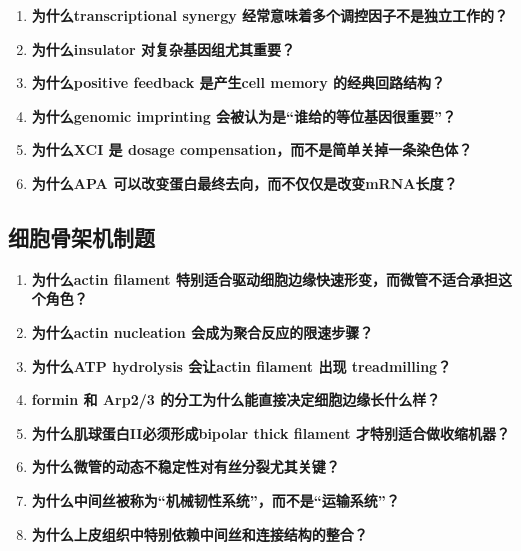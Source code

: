 \documentclass[12pt,fontset=none]{ctexart}
\begin{document}
\begin{enumerate}
\item \textbf{为什么transcriptional synergy 经常意味着多个调控因子不是独立工作的？}

\item \textbf{为什么insulator 对复杂基因组尤其重要？}

\item \textbf{为什么positive feedback 是产生cell memory 的经典回路结构？}

\item \textbf{为什么genomic imprinting 会被认为是“谁给的等位基因很重要”？}

\item \textbf{为什么XCI 是 dosage compensation，而不是简单关掉一条染色体？}

\item \textbf{为什么APA 可以改变蛋白最终去向，而不仅仅是改变mRNA长度？}

\end{enumerate}



\subsection*{细胞骨架机制题}
\begin{enumerate}
\item \textbf{为什么actin filament 特别适合驱动细胞边缘快速形变，而微管不适合承担这个角色？}

\item \textbf{为什么actin nucleation 会成为聚合反应的限速步骤？}

\item \textbf{为什么ATP hydrolysis 会让actin filament 出现 treadmilling？}

\item \textbf{formin 和 Arp2/3 的分工为什么能直接决定细胞边缘长什么样？}

\item \textbf{为什么肌球蛋白II必须形成bipolar thick filament 才特别适合做收缩机器？}

\item \textbf{为什么微管的动态不稳定性对有丝分裂尤其关键？}

\item \textbf{为什么中间丝被称为“机械韧性系统”，而不是“运输系统”？}

\item \textbf{为什么上皮组织中特别依赖中间丝和连接结构的整合？}

\end{enumerate}
\end{document}
